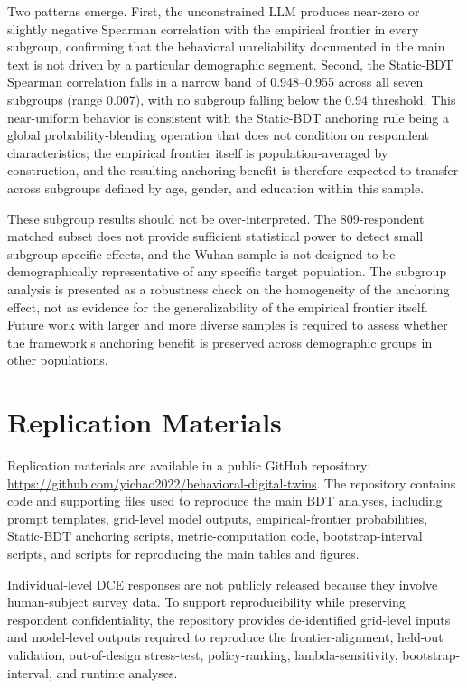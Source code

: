 \documentclass[11pt]{article}
\begin{document}
Two patterns emerge. First, the unconstrained LLM produces near-zero or slightly negative Spearman correlation with the empirical frontier in every subgroup, confirming that the behavioral unreliability documented in the main text is not driven by a particular demographic segment. Second, the Static-BDT Spearman correlation falls in a narrow band of 0.948--0.955 across all seven subgroups (range 0.007), with no subgroup falling below the 0.94 threshold. This near-uniform behavior is consistent with the Static-BDT anchoring rule being a global probability-blending operation that does not condition on respondent characteristics; the empirical frontier itself is population-averaged by construction, and the resulting anchoring benefit is therefore expected to transfer across subgroups defined by age, gender, and education within this sample.

These subgroup results should not be over-interpreted. The 809-respondent matched subset does not provide sufficient statistical power to detect small subgroup-specific effects, and the Wuhan sample is not designed to be demographically representative of any specific target population. The subgroup analysis is presented as a robustness check on the homogeneity of the anchoring effect, not as evidence for the generalizability of the empirical frontier itself. Future work with larger and more diverse samples is required to assess whether the framework's anchoring benefit is preserved across demographic groups in other populations.

\section{Replication Materials}
\label{app:replication}

Replication materials are available in a public GitHub repository:
\url{https://github.com/yichao2022/behavioral-digital-twins}. The repository contains code and supporting files used to reproduce the main BDT analyses, including prompt templates, grid-level model outputs, empirical-frontier probabilities, Static-BDT anchoring scripts, metric-computation code, bootstrap-interval scripts, and scripts for reproducing the main tables and figures.

Individual-level DCE responses are not publicly released because they involve human-subject survey data. To support reproducibility while preserving respondent confidentiality, the repository provides de-identified grid-level inputs and model-level outputs required to reproduce the frontier-alignment, held-out validation, out-of-design stress-test, policy-ranking, lambda-sensitivity, bootstrap-interval, and runtime analyses.











\end{document}
